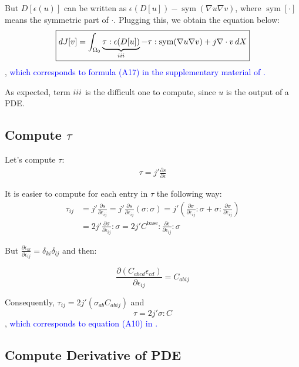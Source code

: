 \documentclass[11pt]{article}
\DeclareMathOperator{\sym}{sym}
\newcommand{\RNum}[1]{\uppercase\expandafter{\romannumeral #1\relax}}
\newcommand{\blue}{\textcolor{blue}}
\begin{document}
But $D[\epsilon(u)]$ can be written as $\epsilon(D[u]) - \sym(\nabla u \nabla v)$, where $\sym[\cdot]$ means the symmetric part of $\cdot$. Plugging this, we obtain the equation below:
\begin{equation}
  \boxed{dJ[v] = \int_{\Omega_0} \underbrace{\tau : \epsilon(D[u])}_{\RNum{3}} - \tau : \sym(\nabla u \nabla v) + j \nabla \cdot v \, dX}
  \label{eq:dJ}
\end{equation}
, \blue{which corresponds to formula (A17) in the supplementary material of \cite{panetta2017}.}

As expected, term $\RNum{3}$ is the difficult one to compute, since $u$ is the output of a PDE.

\subsection{Compute $\tau$}

Let's compute $\tau$:
\begin{align*}
  \tau = j' \frac{\partial s}{\partial \epsilon}  
\end{align*}

It is easier to compute for each entry in $\tau$ the following way:
\begin{align*}
  \tau_{ij} &= j' \frac{\partial s}{\partial \epsilon_{ij}} = j' \frac{\partial s}{\partial \epsilon_{ij}}( \sigma : \sigma )  = j' \left( \frac{\partial \sigma}{\partial \epsilon_{ij}}: \sigma + \sigma :   \frac{\partial \sigma}{\partial \epsilon_{ij}} \right) \\
  &= 2j' \frac{\partial \sigma}{\partial \epsilon_{ij}}: \sigma = 2j' C^{\text{base}} : \frac{\partial \epsilon}{\partial \epsilon_{ij}} : \sigma
\end{align*}

But $\frac{\partial \epsilon_{kl}}{\partial \epsilon_{ij}} = \delta_{ki}\delta_{lj}$ and then:

$$
  \frac{\partial (C_{abcd}\epsilon_{cd})}{\partial \epsilon_{ij}} = C_{abij}
$$

Consequently, $\tau_{ij} = 2j' (\sigma_{ab} C_{abij})$ and
\begin{equation}
  \boxed{\tau = 2j' \sigma : C}
  \label{eq:tau}
\end{equation}
, \blue{which corresponds to equation (A10) in \cite{panetta2017}.}

\subsection{Compute Derivative of PDE}
\end{document}
